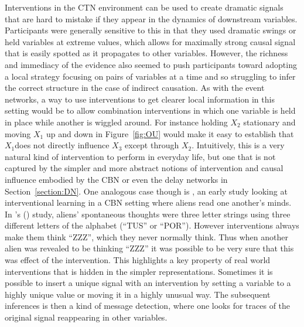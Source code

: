 \documentclass{cambridge7A}%
\def\citeapos#1{\citeauthor{#1}'s (\citeyear{#1})}
\begin{document}
Interventions in the CTN environment can be used to create dramatic signals that are hard to mistake if they appear in the dynamics of downstream variables.  Participants were generally sensitive to this in that they used dramatic swings or held variables at extreme values, which allows for maximally strong causal signal that is easily spotted as it propagates to other variables.  However, the richness and immediacy of the evidence also seemed to push participants toward adopting a local strategy focusing on pairs of variables at a time and so struggling to infer the correct structure in the case of indirect causation.  As with the event networks, a way to use interventions to get clearer local information in this setting would be to allow combination interventions in which one variable is held in place while another is wiggled around.  For instance holding $X_2$ stationary and moving $X_1$ up and down in Figure~\ref{fig:OU} would make it easy to establish that $X_1$does not directly influence $X_3$ except through $X_2$.  Intuitively, this is a very natural kind of intervention to perform in everyday life, but one that is not captured by the simpler and more abstract notions of intervention and causal influence embodied by the CBN or even the delay networks in Section~\ref{section:DN}.  One analogous case though is \cite{steyvers2003intervention}, an early study looking at interventional learning in a CBN setting where aliens read one another's minds.  In \citeapos{steyvers2003intervention} study, aliens' spontaneous thoughts were three letter strings using three different letters of the alphabet (``TUS'' or ``POR'').  However interventions always make them think ``ZZZ'', which they never normally think.  Thus when another alien was revealed to be thinking ``ZZZ'' it was possible to be very sure that this was effect of the intervention.  This highlights a key property of real world interventions that is hidden in the simpler representations.  Sometimes it is possible to insert a unique signal with an intervention by setting a variable to a highly unique value or moving it in a highly unusual way.  The subsequent inferences is then a kind of message detection, where one looks for traces of the original signal reappearing in other variables.
\end{document}
